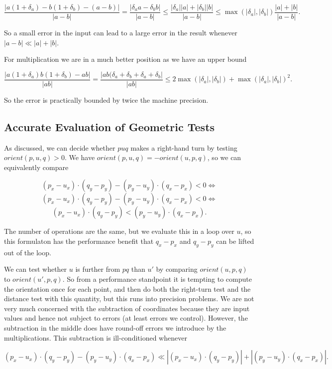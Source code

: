 $$\frac{|a(1 + \delta_a) - b(1 + \delta_b) - (a - b)|}{|a - b|} = 
\frac{|\delta_a a - \delta_b b|}{|a - b|} \leq 
\frac{|\delta_a||a| + |\delta_b| |b|}{|a - b|} \leq 
\max(|\delta_a|, |\delta_b|) \frac{|a| + |b|}{|a - b|}.$$

So a small error in the input can lead to a large error in the result whenever 
$|a - b| \ll |a| + |b|$.

For multiplication we are in a much better position as we have an upper bound

$$\frac{|a(1 + \delta_a)b(1 + \delta_b) - ab|}{|ab|} =
\frac{|ab(\delta_a + \delta_b + \delta_a + \delta_b|}{|ab|} \leq
2\max(|\delta_a|, |\delta_b|) + \max(|\delta_a|, |\delta_b|)^2.$$

So the error is practically bounded by twice the machine precision.

\subsection{Accurate Evaluation of Geometric Tests}

As discussed, we can decide whether $puq$ makes a right-hand turn by testing
$orient(p, u, q) > 0$. We have $orient(p, u, q) = -orient(u, p, q)$, so
we can equivalently compare

$$(p_x - u_x) \cdot (q_y - p_y) - (p_y - u_y) \cdot (q_x - p_x) < 0 \iff$$
$$(p_x - u_x) \cdot (q_y - p_y) - (p_y - u_y) \cdot (q_x - p_x) < 0 \iff$$
$$(p_x - u_x) \cdot (q_y - p_y) < (p_y - u_y) \cdot (q_x - p_x).$$

The number of operations are the same, but we evaluate this in a loop over $u$, 
so this formulaton has the performance benefit that $q_x - p_x$ and $q_y - p_y$ 
can be lifted out of the loop.

We can test whether $u$ is further from $pq$ than $u'$ by comparing
$orient(u, p, q)$ to $orient(u', p, q)$. So from a performance standpoint it
is tempting to compute the orientation once for each point, and then do both
the right-turn test and the distance test with this quantity, but this
runs into precision problems. We are not very much concerned with the
subtraction of coordinates because they are input values and hence not
subject to errors (at least errors we control). However, the subtraction 
in the middle does have round-off errors we introduce by the multiplications.
This subtraction is ill-conditioned whenever

$$(p_x - u_x) \cdot (q_y - p_y) - (p_y - u_y) \cdot (q_x - p_x) \ll
|(p_x - u_x) \cdot (q_y - p_y)| + |(p_y - u_y) \cdot (q_x - p_x)|.$$

